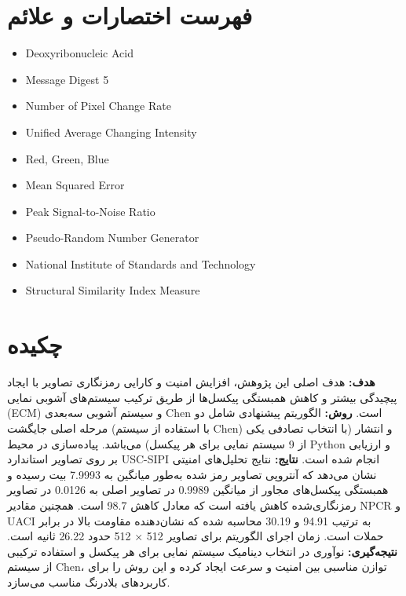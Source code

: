 \documentclass[a4paper,12pt]{report}
\renewcommand{\%}{\lr{\oldpercent}}
\providecommand{\lr}[1]{#1}
\begin{document}
\chapter*{فهرست اختصارات و علائم}
\begin{latin}
\begin{itemize}
    \item[DNA] Deoxyribonucleic Acid
    \item[MD5] Message Digest 5
    \item[NPCR] Number of Pixel Change Rate
    \item[UACI] Unified Average Changing Intensity
    \item[RGB] Red, Green, Blue
    \item[MSE] Mean Squared Error
    \item[PSNR] Peak Signal-to-Noise Ratio
    \item[PRNG] Pseudo-Random Number Generator
    \item[NIST] National Institute of Standards and Technology
    \item[SSIM] Structural Similarity Index Measure
\end{itemize}
\end{latin}
\newpage
\clearpage

\setcounter{page}{1}

\chapter*{چکیده}

\textbf{هدف:} هدف اصلی این پژوهش، افزایش امنیت و کارایی رمزنگاری تصاویر با ایجاد پیچیدگی بیشتر و کاهش همبستگی پیکسل‌ها از طریق ترکیب سیستم‌های آشوبی نمایی (\lr{ECM}) و سیستم آشوبی سه‌بعدی \lr{Chen} است. 
\textbf{روش:} الگوریتم پیشنهادی شامل دو مرحله اصلی جایگشت (با استفاده از سیستم \lr{Chen}) و انتشار (با انتخاب تصادفی یکی از 9 سیستم نمایی برای هر پیکسل) می‌باشد. پیاده‌سازی در محیط \lr{Python} و ارزیابی بر روی تصاویر استاندارد \lr{USC-SIPI} انجام شده است. 
\textbf{نتایج:} نتایج تحلیل‌های امنیتی نشان می‌دهد که آنتروپی تصاویر رمز شده به‌طور میانگین به 7.9993 بیت رسیده و همبستگی پیکسل‌های مجاور از میانگین 0.9989 در تصاویر اصلی به 0.0126 در تصاویر رمزنگاری‌شده کاهش یافته است که معادل کاهش 98.7\% است. همچنین مقادیر \lr{NPCR} و \lr{UACI} به ترتیب 94.91\% و 30.19\% محاسبه شده که نشان‌دهنده مقاومت بالا در برابر حملات است. زمان اجرای الگوریتم برای تصاویر 512 × 512 حدود 26.22 ثانیه است. 
\textbf{نتیجه‌گیری:} نوآوری در انتخاب دینامیک سیستم نمایی برای هر پیکسل و استفاده ترکیبی از سیستم \lr{Chen}، توازن مناسبی بین امنیت و سرعت ایجاد کرده و این روش را برای کاربردهای بلادرنگ مناسب می‌سازد.
    
\end{document}

